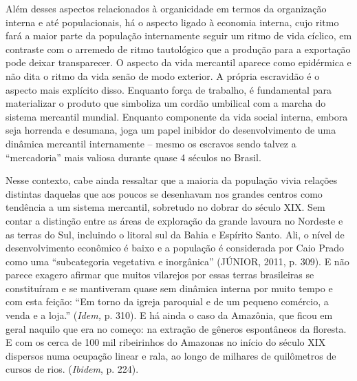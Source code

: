 Além desses aspectos relacionados à organicidade em termos da
organização interna e até populacionais, há o aspecto ligado à economia
interna, cujo ritmo fará a maior parte da população internamente seguir
um ritmo de vida cíclico, em contraste com o arremedo de ritmo
tautológico que a produção para a exportação pode deixar transparecer. O
aspecto da vida mercantil aparece como epidérmica e não dita o ritmo da
vida senão de modo exterior. A própria escravidão é o aspecto mais
explícito disso. Enquanto força de trabalho, é fundamental para
materializar o produto que simboliza um cordão umbilical com a marcha do
sistema mercantil mundial. Enquanto componente da vida social interna,
embora seja horrenda e desumana, joga um papel inibidor do
desenvolvimento de uma dinâmica mercantil internamente -- mesmo os
escravos sendo talvez a ``mercadoria'' mais valiosa durante quase 4
séculos no Brasil.

Nesse contexto, cabe ainda ressaltar que a maioria da população vivia
relações distintas daquelas que aos poucos se desenhavam nos grandes
centros como tendência a um sistema mercantil, sobretudo no dobrar do
século XIX. Sem contar a distinção entre as áreas de exploração da
grande lavoura no Nordeste e as terras do Sul, incluindo o litoral sul
da Bahia e Espírito Santo. Ali, o nível de desenvolvimento econômico é
baixo e a população é considerada por Caio Prado como uma ``subcategoria
vegetativa e inorgânica'' (JÚNIOR, 2011, p. 309). E não parece exagero
afirmar que muitos vilarejos por essas terras brasileiras se
constituíram e se mantiveram quase sem dinâmica interna por muito tempo
e com esta feição: ``Em torno da igreja paroquial e de um pequeno
comércio, a venda e a loja.'' (\emph{Idem,} p. 310). E há ainda o caso
da Amazônia, que ficou em geral naquilo que era no começo: na extração
de gêneros espontâneos da floresta. E com os cerca de 100 mil
ribeirinhos do Amazonas no início do século XIX dispersos numa ocupação
linear e rala, ao longo de milhares de quilômetros de cursos de rios.
(\emph{Ibidem}, p. 224).


